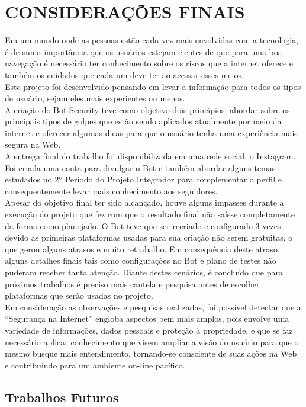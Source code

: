 \chapter{\uppercase{Considerações finais}}
\label{conclusao}

Em um mundo onde as pessoas estão cada vez mais envolvidas com a tecnologia, é de suma importância que os usuários estejam cientes de que para uma boa navegação é necessário ter conhecimento sobre os riscos que a internet oferece e também os cuidados que cada um deve ter ao acessar esses meios.  \\
Este projeto foi desenvolvido pensando em levar a informação para todos os tipos de usuário, sejam eles mais experientes ou menos. \\
A criação do Bot Security teve como objetivo dois princípios: abordar sobre os principais tipos de golpes que estão sendo aplicados atualmente por meio da internet e oferecer algumas dicas para que o usuário tenha uma experiência mais segura na Web. \\
A entrega final do trabalho foi disponibilizada em uma rede social, o Instagram. Foi criada uma conta para divulgar o Bot e também abordar alguns temas estudados no 2º Período do Projeto Integrador para complementar o perfil e consequentemente levar mais conhecimento aos seguidores. \\
Apesar do objetivo final ter sido alcançado, houve alguns impasses durante a execução do projeto que fez com que o resultado final não saísse completamente da forma como planejado. O Bot teve que ser recriado e configurado 3 vezes devido as primeiras plataformas usadas para sua criação não serem gratuitas, o que gerou alguns atrasos e muito retrabalho. Em consequência deste atraso, alguns detalhes finais tais como configurações no Bot e plano de testes não puderam receber tanta atenção. Diante destes cenários, é concluído que para próximos trabalhos é preciso mais cautela e pesquisa antes de escolher plataformas que serão usadas no projeto. \\
Em consideração as observações e pesquisas realizadas, foi possível detectar que a “Segurança na Internet” engloba aspectos bem mais amplos, pois envolve uma variedade de informações, dados pessoais e proteção à propriedade, e que se faz necessário aplicar conhecimento que visem ampliar a visão do usuário para que o mesmo busque mais entendimento, tornando-se consciente de suas ações na Web e contribuindo para um ambiente on-line pacífico.


 \section{Trabalhos Futuros}
  
